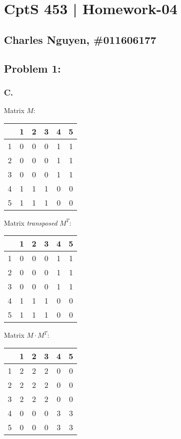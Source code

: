 \documentclass[12pt,letterpaper]{article}
\begin{document}
\section*{CptS 453 | Homework-04 }
\subsection*{Charles Nguyen, \#011606177 }

\subsection*{Problem 1:}
\subsubsection*{C.}
Matrix $M$:
\begin{tabular}{|*{6}{c|}}
      \hline
      & 1 & 2 & 3 & 4 & 5\\
      \hline
    1 & 0 & 0 & 0 & 1 & 1\\
      \hline
    2 & 0 & 0 & 0 & 1 & 1\\
      \hline
    3 & 0 & 0 & 0 & 1 & 1\\
      \hline
    4 & 1 & 1 & 1 & 0 & 0\\
      \hline
    5 & 1 & 1 & 1 & 0 & 0\\
      \hline
\end{tabular}


Matrix \emph{transposed} $M^T$:
\begin{tabular}{|*{6}{c|}}
      \hline
      & 1 & 2 & 3 & 4 & 5\\
      \hline
    1 & 0 & 0 & 0 & 1 & 1\\
      \hline
    2 & 0 & 0 & 0 & 1 & 1\\
      \hline
    3 & 0 & 0 & 0 & 1 & 1\\
      \hline
    4 & 1 & 1 & 1 & 0 & 0\\
      \hline
    5 & 1 & 1 & 1 & 0 & 0\\
      \hline
\end{tabular}


Matrix $M\cdot M^T$:
\begin{tabular}{|*{6}{c|}}
      \hline
      & 1 & 2 & 3 & 4 & 5\\
      \hline
    1 & 2 & 2 & 2 & 0 & 0\\
      \hline
    2 & 2 & 2 & 2 & 0 & 0\\
      \hline
    3 & 2 & 2 & 2 & 0 & 0\\
      \hline
    4 & 0 & 0 & 0 & 3 & 3\\
      \hline
    5 & 0 & 0 & 0 & 3 & 3\\
      \hline
\end{tabular}
\end{document}
